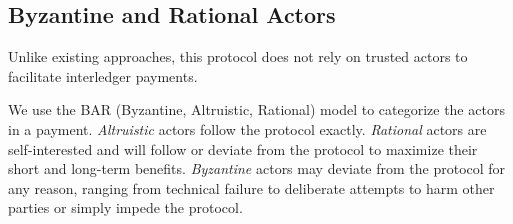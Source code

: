 \documentclass[letterpaper,twocolumn,10pt]{article}
\begin{document}





\subsection{Byzantine and Rational Actors}

Unlike existing approaches, this protocol does not rely on trusted actors to facilitate interledger payments.

We use the BAR (Byzantine, Altruistic, Rational) model to categorize the actors in a payment. \textit{Altruistic} actors follow the protocol exactly. \textit{Rational} actors are self-interested and will follow or deviate from the protocol to maximize their short and long-term benefits. \textit{Byzantine} actors may deviate from the protocol for any reason, ranging from technical failure to deliberate attempts to harm other parties or simply impede the protocol. \cite{aiyer2005bar}
\end{document}
